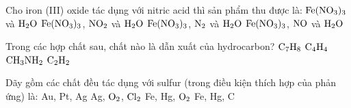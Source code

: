 \documentclass[11pt,a4paper]{article}
\begin{document}
\begin{ex}
Cho iron (III) oxide tác dụng với nitric acid thì sản phẩm thu được là:
\choice
{\True $\ce{Fe(NO3)3}$ và $\ce{H2O}$}
{$\ce{Fe(NO3)3}$, $\ce{NO2}$ và $\ce{H2O}$}
{$\ce{Fe(NO3)3}$, $\ce{N2}$ và $\ce{H2O}$}
{$\ce{Fe(NO3)3}$, $\ce{NO}$ và $\ce{H2O}$}

\end{ex}
\begin{ex}
Trong các hợp chất sau, chất nào là dẫn xuất của hydrocarbon?
\choice
{$\ce{C7H8}$}
{$\ce{C4H4}$}
{\True $\ce{CH3NH2}$}
{$\ce{C2H2}$}

\end{ex}
\begin{ex}
Dãy gồm các chất đều tác dụng với sulfur (trong điều kiện thích hợp của phản ứng) là:
\choice
{Au, Pt, Ag}
{Ag, $\ce{O2}$, $\ce{Cl2}$}
{\True Fe, Hg, $\ce{O2}$}
{Fe, Hg, C}

\end{ex}
\end{document}
